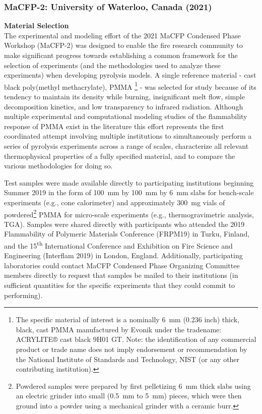 \documentclass[12pt,demo]{article}
\begin{document}
\subsubsection{MaCFP-2: University of Waterloo, Canada (2021)}

\textbf{Material Selection}\\
The experimental and modeling effort of the 2021 MaCFP Condensed Phase Workshop (MaCFP-2) was designed to enable the fire research community to make significant progress towards establishing a common framework for the selection of experiments (and the methodologies used to analyze these experiments) when developing pyrolysis models. A single reference material - cast black poly(methyl methacrylate), PMMA \footnote{The specific material of interest is a nominally 6~mm (0.236 inch) thick, black, cast PMMA manufactured by Evonik under the tradename: ACRYLITE® cast black 9H01 GT. Note: the identification of any commercial product or trade name does not imply endorsement or recommendation by the National Institute of Standards and Technology, NIST (or any other contributing institution).} - was selected for study because of its tendency to maintain its density while burning, insignificant melt flow, simple decomposition kinetics, and low transparency to infrared radiation. Although multiple experimental \cite{fiola2020comparison, kashiwagi1982study, hirata1985thermal, tewarson1992fire, rhodes1996burning} and computational modeling studies of the flammability response of PMMA exist in the literature \cite{fiola2020comparison, consalvi2008numerical, leventon2015flame, fukumoto2018large} this effort represents the first coordinated attempt involving multiple institutions to simultaneously perform a series of pyrolysis experiments across a range of scales, characterize all relevant thermophysical properties of a fully specified material, and to compare the various methodologies for doing so.

Test samples were made available directly to participating institutions beginning Summer 2019 in the form of 100~mm by 100~mm by 6~mm slabs for bench-scale experiments (e.g., cone calorimeter) and approximately 300~mg vials of powdered\footnote{Powdered samples were prepared by first pelletizing 6~mm thick slabs using an electric grinder into small (0.5~mm to 5~mm) pieces, which were then ground into a powder using a mechanical grinder with a ceramic burr.} PMMA for micro-scale experiments (e.g., thermogravimetric analysis, TGA). Samples were shared directly with participants who attended the 2019 Flammability of Polymeric Materials Conference (FRPM19) in Turku, Finland, and the 15\textsuperscript{th} International Conference and Exhibition on Fire Science and Engineering (Interflam 2019) in London, England. Additionally, participating laboratories could contact MaCFP Condensed Phase Organizing Committee members directly to request that samples be mailed to their institutions (in sufficient quantities for the specific experiments that they could commit to performing). \\
\end{document}
